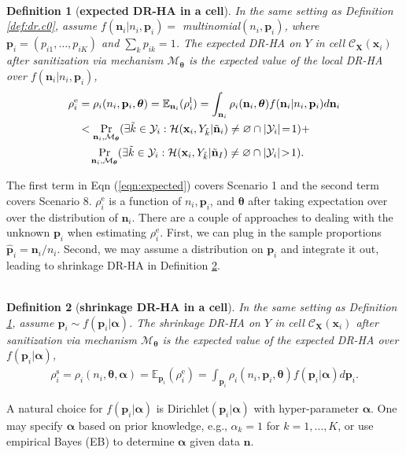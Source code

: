 \documentclass[10pt,journal,compsoc]{IEEEtran}
\newtheorem{defn}{\vspace{-6pt}\\ Definition}
\newcommand{\M}{\mathcal{M}}
\newcommand{\p}{\mathbf{p}}
\newcommand{\n}{\mathbf{n}}
\newcommand{\X}{\mathbf{X}}
\newcommand{\x}{\mathbf{x}}
\newcommand{\C}{\mathcal{C}}
\newcommand{\bs}{\boldsymbol}
\begin{document}
\vspace{-3pt}\begin{defn}[\textbf{expected  DR-HA  in a cell}] \label{def:dr.c1}
In the same setting as Definition \ref{def:dr.c0}, assume $f(\n_i|n_i, \p_i)=$ multinomial$(n_i,\p_i)$, where $\p_i=(p_{i1},\ldots, p_{iK})$ and $\sum_k{p_{ik}}=1$. The expected DR-HA on $Y$ in cell $\C_{\X}(\x_i)$ after sanitization via mechanism $\M_{\bs\theta}$ is the expected value of the local DR-HA over $f(\n_i|n_i, \p_i)$, 
\vspace{-6pt}
\begin{align}\label{eqn:expected}
\rho^{\text{e}}_i&=\rho_i(n_i,\p_i,\bs\theta)=\mathbb{E}_{\n_i}(\rho^{\text{l}}_i)=
\int_{\n_i} \rho_i(\n_i,\bs\theta) f(\n_i|n_i,\p_i) d\n_i\notag\\
&<\Pr_{\n_i,\M_{\bs\theta}}(\exists \tilde{k}\in\mathcal{Y}_i: \mathcal{H}(\x_i,Y_{\tilde{k}}|\tilde{\n}_i) \ne \varnothing \cap |\mathcal{Y}_i|\!=\!1)+\notag\\
&\quad\Pr_{\n_i,\M_{\bs\theta}}(\exists \tilde{k}\in\mathcal{Y}_i:
\mathcal{H}(\x_i,Y_{\tilde{k}}|\tilde{\n}_I) \ne \varnothing \cap |\mathcal{Y}_i|\!>\!1).
\end{align}
\end{defn}\vspace{-6pt}
The first term in Eqn (\ref{eqn:expected}) covers Scenario 1 and the second term covers Scenario 8. $\rho^{\text{e}}_i$ is a function of $n_i,\p_i$, and $\bs\theta$ after taking expectation over over the distribution of $\n_i$. There are a couple of approaches to dealing with the unknown  $\p_i$ when estimating $\rho^{\text{e}}_i$. First, we can plug in the sample proportions $\hat{\p}_i=\n_i/n_i$. Second, we may assume a distribution on $\p_i$ and integrate it out, leading to shrinkage DR-HA in Definition \ref{def:dr.c2}.\vspace{-3pt}
\begin{defn}[\textbf{shrinkage DR-HA in a cell}] \label{def:dr.c2}
In the same setting as Definition \ref{def:dr.c1}, assume $\p_i\sim f(\p_i|\bs\alpha)$. The shrinkage DR-HA on $Y$ in cell $\C_{\X}(\x_i)$ after sanitization  via mechanism $\M_{\bs\theta}$ is the expected value of the expected DR-HA over $f(\p_i|\bs\alpha)$, \vspace{-3pt}
\begin{align}\label{eqn:shrinkage}
\!\!\!\rho^{\text{s}}_i\!=\!\rho_i(n_i, \bs\theta,\bs\alpha) \!=\!\mathbb{E}_{\p_i}(\rho^{\text{e}}_i)
\!\!=\!\!\int_{\p_i}\!\!\rho_i(n_i,\p_i,\bs\theta) f(\p_i|\bs\alpha) d\p_i.\!\!
\end{align}
\end{defn}
\vspace{-6pt} 
A natural choice for $f(\p_i|\bs\alpha)$ is Dirichlet$(\p_i|\bs\alpha)$ with hyper-parameter $\bs\alpha$.  One may specify $\bs\alpha$ based on prior knowledge, e.g., $\alpha_k\!=\!1$ for $k\!=\!1,\ldots,K$, or use empirical Bayes (EB) to determine $\bs\alpha$ given data $\n$. 
\end{document}
